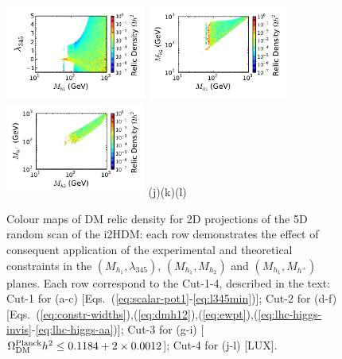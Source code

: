 \documentclass[12pt,a4paper]{article}
\begin{document}
\begin{figure}[htb]
\vskip 0.0cm
{\hspace*{-0.3cm}\includegraphics[width=0.41\textwidth]{Mh1_ld345_Omega_large-cut12345678.pdf}}%
{\hspace*{-1.78cm}\includegraphics[width=0.41\textwidth]{Mh1_Mh2_Omega_large-cut12345678.pdf}}%
{\hspace*{-1.77cm}\includegraphics[width=0.41\textwidth]{Mhc_Mh2_Omega_large-cut12345678.pdf}}%
\vskip -1.05cm
\hspace*{1.2cm}(j)\hspace*{0.35\textwidth}\hspace*{-1.3cm}(k)\hspace*{0.35\textwidth}\hspace*{-1.2cm}(l)
\caption{Colour maps of DM relic density for 2D projections of the 5D random scan of the i2HDM:  
each row demonstrates the effect of consequent application
of the experimental and theoretical constraints in the $(M_{h_1},\lambda_{345})$, $(M_{h_1},M_{h_2})$ and 
$(M_{h_1},M_{h^{+}})$ planes. Each row correspond to the Cut-1-4, described in the text: Cut-1 for (a-c) [Eqs.~(\ref{eq:scalar-pot1}-\ref{eq:l345min})]; Cut-2 for (d-f) [Eqs.~(\ref{eq:constr-widths}),(\ref{eq:dmh12}),(\ref{eq:ewpt}),(\ref{eq:lhc-higgs-invis}-\ref{eq:lhc-higgs-aa})]; Cut-3 for (g-i) [$\Omega_{\rm DM}^{\rm Planck} h^2 \le 0.1184+2\times 0.0012$]; Cut-4 for (j-l) [LUX].
%
\label{fig:dm-i2hdm}} 
\end{figure}
\end{document}
